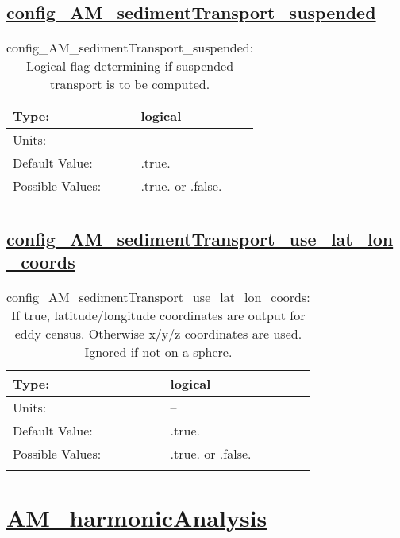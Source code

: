 \subsection[config\_AM\_sedimentTransport\_suspended]{\hyperref[sec:nm_tab_AM_sedimentTransport]{config\_AM\_sedimentTransport\_suspended}}
\label{subsec:nm_sec_config_AM_sedimentTransport_suspended}
\begin{center}
\begin{longtable}{| p{2.0in} || p{4.0in} |}
    \hline
    Type: & logical \\
    \hline
    Units: & -- \\
    \hline
    Default Value: & .true. \\
    \hline
    Possible Values: & .true. or .false. \\
    \hline
    \caption{config\_AM\_sedimentTransport\_suspended: Logical flag determining if suspended transport is to be computed.}
\end{longtable}
\end{center}
\subsection[config\_AM\_sedimentTransport\_use\_lat\_lon\_coords]{\hyperref[sec:nm_tab_AM_sedimentTransport]{config\_AM\_sedimentTransport\_use\_lat\_lon\_coords}}
\label{subsec:nm_sec_config_AM_sedimentTransport_use_lat_lon_coords}
\begin{center}
\begin{longtable}{| p{2.0in} || p{4.0in} |}
    \hline
    Type: & logical \\
    \hline
    Units: & -- \\
    \hline
    Default Value: & .true. \\
    \hline
    Possible Values: & .true. or .false. \\
    \hline
    \caption{config\_AM\_sedimentTransport\_use\_lat\_lon\_coords: If true, latitude/longitude coordinates are output for eddy census. Otherwise x/y/z coordinates are used. Ignored if not on a sphere.}
\end{longtable}
\end{center}
\section[AM\_harmonicAnalysis]{\hyperref[sec:nm_tab_AM_harmonicAnalysis]{AM\_harmonicAnalysis}}
\label{sec:nm_sec_AM_harmonicAnalysis}
